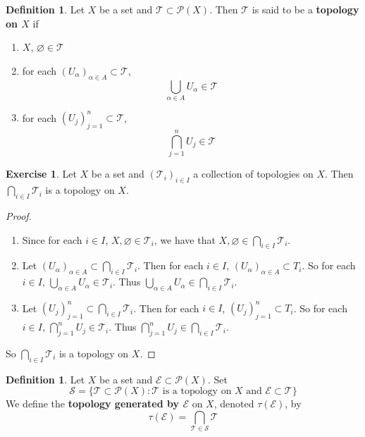 \documentclass[12pt]{amsart}
\theoremstyle{definition}
\newtheorem{defn}[definition]{Definition}
\newtheorem{ex}[definition]{Exercise}
\newcommand{\al}{\alpha}
\newcommand{\MS}{\mathcal{S}}
\newcommand{\MP}{\mathcal{P}}
\newcommand{\ME}{\mathcal{E}}
\newcommand{\MT}{\mathcal{T}}
\newcommand{\lex}[1]{\label{ex:#1}}
\newcommand{\ld}[1]{\label{defn:#1}}
\begin{document}
	\begin{defn} \ld{31001}
	Let $X$ be a set and $\MT \subset \MP(X)$. Then $\MT$ is said to be a \textbf{topology on $X$} if 
	\begin{enumerate}
	\item $X$, $\varnothing \in \MT$ 
	\item for each $(U_{\al})_{\al \in A} \subset \MT$, $$\bigcup_{\al \in A}U_{\al} \in \MT$$
	\item for each $(U_j)_{j=1}^n \subset \MT$, $$\bigcap_{j=1}^n U_{j} \in \MT$$
	\end{enumerate}
	\end{defn}		
	
	\begin{ex} \lex{31002} 
		Let $X$ be a set and $(\MT_{i})_{i \in I}$ a collection of topologies on $X$. Then $\bigcap\limits_{i \in I}\MT_i$ is a topology on $X$.
	\end{ex}
	
	\begin{proof}\
	\begin{enumerate}
	\item Since for each $i \in I$, $X, \varnothing \in \MT_{i}$, we have that $X, \varnothing \in \bigcap\limits_{i \in I}\MT_i$.
	\item Let $(U_{\al})_{\al \in A} \subset \bigcap\limits_{i \in I}\MT_i$. Then for each $i \in I$, $(U_{\al})_{\al \in A} \subset T_i$. So for each $i \in I$, $\bigcup\limits_{\al \in A}U_{\al} \in \MT_i$. Thus $\bigcup\limits_{\al \in A}U_{\al} \in \bigcap\limits_{i \in I}\MT_i$.
	\item Let $(U_{j})_{j=1}^n \subset \bigcap\limits_{i \in I}\MT_i$. Then for each $i \in I$, $(U_{j})_{j=1}^n \subset T_i$. So for each $i \in I$, $\bigcap\limits_{j=1}^n U_{j} \in \MT_i$. Thus $\bigcap\limits_{j=1}^n U_{j} \in \bigcap\limits_{i \in I}\MT_i$.
	\end{enumerate}
	So $\bigcap\limits_{i \in I}\MT_i$ is a topology on $X$.
	\end{proof}
	
	\begin{defn} \ld{31003}
	Let $X$ be a set and $\ME \subset \MP(X)$. Set 
	\begin{equation*}
	\MS = \{\MT \subset \MP(X): \MT \text{ is a topology 	on $X$ and $\ME \subset \MT$}\}
	\end{equation*}	 
We define the \textbf{topology generated by $\ME$} on $X$, denoted $\tau(\ME)$, by $$\tau(\ME) = \bigcap_{\MT \in \MS} \MT$$
	\end{defn}
	
\end{document}
